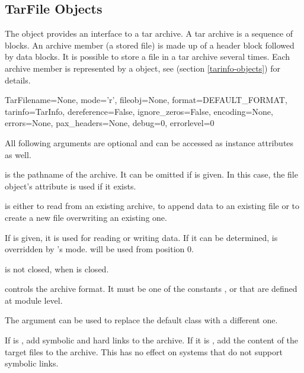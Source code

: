 
\subsection{TarFile Objects \label{tarfile-objects}}

The  object provides an interface to a tar archive. A tar
archive is a sequence of blocks. An archive member (a stored file) is made up
of a header block followed by data blocks. It is possible to store a file in a
tar archive several times. Each archive member is represented by a
 object, see  (section
\ref{tarinfo-objects}) for details.

\begin{classdesc}{TarFile}{name=None, mode='r', fileobj=None,
        format=DEFAULT_FORMAT, tarinfo=TarInfo, dereference=False,
        ignore_zeros=False, encoding=None, errors=None, pax_headers=None,
        debug=0, errorlevel=0}

    All following arguments are optional and can be accessed as instance
    attributes as well.

     is the pathname of the archive. It can be omitted if
     is given. In this case, the file object's 
    attribute is used if it exists.

     is either  to read from an existing archive,
     to append data to an existing file or  to create a new
    file overwriting an existing one.

    If  is given, it is used for reading or writing data.
    If it can be determined,  is overridden by 's mode.
     will be used from position 0.
    \begin{notice}
         is not closed, when  is closed.
    \end{notice}

     controls the archive format. It must be one of the constants
    ,  or 
    that are defined at module level.

    The  argument can be used to replace the default
     class with a different one.

    If  is , add symbolic and hard links to the
    archive. If it is , add the content of the target files to the
    archive. This has no effect on systems that do not support symbolic links.


\end{classdesc}
